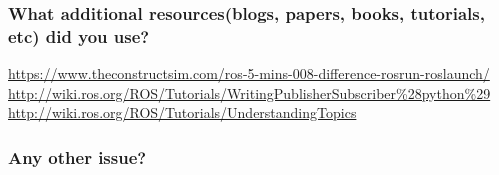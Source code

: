\documentclass{ROS}
\begin{document}
\subsubsection*{What additional resources(blogs, papers, books, tutorials, etc) did you use?} 
\url{https://www.theconstructsim.com/ros-5-mins-008-difference-rosrun-roslaunch/}
\url{http://wiki.ros.org/ROS/Tutorials/WritingPublisherSubscriber%28python%29}
\url{http://wiki.ros.org/ROS/Tutorials/UnderstandingTopics}
\subsubsection*{Any other issue?}
\end{document}
